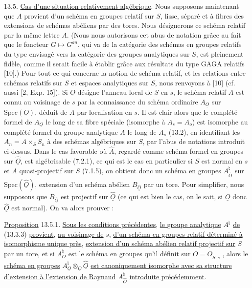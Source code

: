 13.5. \underline{Cas d'une situation relativement algébrique}. Nous supposons maintenant que $A$ provient d'un schéma en groupes relatif sur $S$, lisse, séparé et à fibres des extensions de schémas abéliens par des tores. Nous désignerons ce schéma relatif par la même lettre $A$. (Nous nous autorisons cet abus de notation grâce au fait que le foncteur $G \longmapsto G^{an}$, qui va de la catégorie des schémas en groupes relatifs du type envisagé vers la catégorie des groupes analytiques sur $S$, est pleinement fidèle, comme il serait facile à établir grâce aux résultats du type GAGA relatifs [10].) Pour tout ce qui concerne la notion de schéma relatif, et les relations entre schémas relatifs sur $S$ et espaces analytiques sur $S$, nous renvoyons à [10] (cf. aussi [2, Exp. 15]). Si $\underline{O}$ désigne l'anneau local de $S$ en $s$, le schéma relatif $A$ est connu au voisinage de $s$ par la connaissance du schéma ordinaire $A_{\underline{O}}$ sur $\mathrm{Spec}(\underline{O})$, déduit de $A$ par localisation en $s$. Il est clair alors que le complété formel de $A_{\underline{O}}$ le long de sa fibre spéciale (isomorphe à $A_s = A_o$) est isomorphe au complété formel du groupe analytique $A$ le long de $A_s$ (13.2), en identifiant les $A_n = A \times_S S_n$ à des schémas algébriques sur $S$, par l'abus de notations introduit ci-dessus. Dans le cas favorable où $\hat{A}$, regardé comme schéma formel en groupes sur $\hat{\underline{O}}$, est algébrisable (7.2.1), ce qui est le cas en particulier si $S$ est normal en $s$ et $A$ quasi-projectif sur $S$ (7.1.5), on obtient donc un schéma en groupes $A^{\natural}_{\hat{\underline{O}}}$ sur $\mathrm{Spec}(\hat{\underline{O}})$, extension d'un schéma abélien $B_{\hat{\underline{O}}}$ par un tore. Pour simplifier, nous supposons que $B_{\hat{\underline{O}}}$ est projectif sur $\hat{\underline{O}}$ (ce qui est bien le cas, on le sait, si $\underline{O}$ donc $\hat{\underline{O}}$ est normal). On va alors prouver :



\underline{Proposition} 13.5.1. \underline{Sous les conditions précédentes}, \underline{le groupe analytique} $A^\natural$ \underline{de} (13.3.3) \underline{provient}, \underline{au voisinage de} $s$, \underline{d'un schéma en groupes relatif déterminé à isomorphisme unique près}, \underline{extension d'un schéma abélien relatif projectif sur} $S$ \underline{par un tore, et si} $A^\natural_{\underline{O}}$ \underline{est le schéma en groupes qu'il définit sur} $\underline{O} = \underline{O}_{S,s}$ , \underline{alors le schéma en groupes} $A^\natural_{\underline{O}} \otimes_{\underline{O}} \hat{\underline{O}}$ \underline{est canoniquement isomorphe avec sa structure d'extension à l'extension de Raynaud} $A^\natural_{\hat{\underline{O}}}$ \underline{introduite précédemment}.

